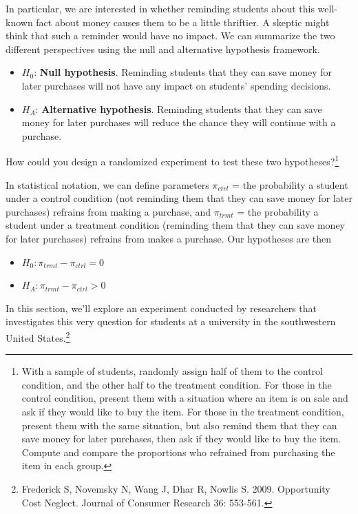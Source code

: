 \documentclass[
  10pt,
  openany]{book}
\theoremstyle{definition}
\theoremstyle{definition}
\theoremstyle{definition}
\theoremstyle{definition}
\theoremstyle{remark}
\begin{document}
In particular, we are interested in whether reminding students about this well-known fact about money causes them to be a little thriftier. A skeptic might think that such a reminder would have no impact. We can summarize the two different perspectives using the null and alternative hypothesis framework.

\begin{itemize}
\item
  \(H_0\): \textbf{Null hypothesis}. Reminding students that they can save money for later purchases will not have any impact on students' spending decisions.
\item
  \(H_A\): \textbf{Alternative hypothesis}. Reminding students that they can save money for later purchases will reduce the chance they will continue with a purchase.
\end{itemize}

How could you design a randomized experiment to test these two hypotheses?\footnote{With a sample of students, randomly assign half of them to the control condition, and the other half to the treatment condition. For those in the control condition, present them with a situation where an item is on sale and ask if they would like to buy the item. For those in the treatment condition, present them with the same situation, but also remind them that they can save money for later purchases, then ask if they would like to buy the item. Compute and compare the proportions who refrained from purchasing the item in each group.}

In statistical notation, we can define parameters \(\pi_{ctrl}\) = the probability a student under a control condition (not reminding them that they can save money for later purchases) refrains from making a purchase, and \(\pi_{trmt}\) = the probability a student under a treatment condition (reminding them that they can save money for later purchases) refrains from makes a purchase. Our hypotheses are then

\begin{itemize}
\item
  \(H_0: \pi_{trmt} - \pi_{ctrl} = 0\)
\item
  \(H_A: \pi_{trmt} - \pi_{ctrl} > 0\)
\end{itemize}

In this section, we'll explore an experiment conducted by researchers that investigates this very question for students at a university in the southwestern United States.\footnote{Frederick S, Novemsky N, Wang J, Dhar R, Nowlis S. 2009. Opportunity Cost Neglect. Journal of Consumer Research 36: 553-561.}
\end{document}

